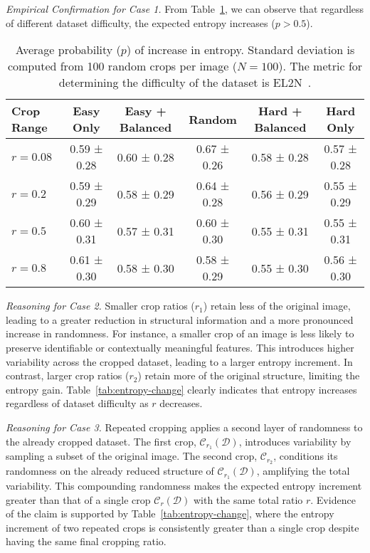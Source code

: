 \textit{Empirical Confirmation for Case 1.}
From Table~\ref{tab:entropy-increase}, we can observe that regardless of different dataset difficulty, the expected entropy increases ($p > 0.5$).

\begin{table}[H]
\centering
\caption{Average probability ($p$) of increase in entropy. Standard deviation is computed from 100 random crops per image ($N=100$).
The metric for determining the difficulty of the dataset is EL2N~\cite{paul2021deep}.
}
\label{tab:entropy-increase}
\begin{tabular}{@{}lccccc@{}}
\toprule
\textbf{Crop Range} & \textbf{Easy Only} & \textbf{Easy + Balanced} & \textbf{Random} & \textbf{Hard + Balanced} & \textbf{Hard Only} \\ \midrule
$r=0.08$ & 0.59 ± 0.28 & 0.60 ± 0.28 & 0.67 ± 0.26 & 0.58 ± 0.28 & 0.57 ± 0.28 \\
$r=0.2$  & 0.59 ± 0.29 & 0.58 ± 0.29 & 0.64 ± 0.28 & 0.56 ± 0.29 & 0.55 ± 0.29 \\
$r=0.5$  & 0.60 ± 0.31 & 0.57 ± 0.31 & 0.60 ± 0.30 & 0.55 ± 0.31 & 0.55 ± 0.31 \\
$r=0.8$  & 0.61 ± 0.30 & 0.58 ± 0.30 & 0.58 ± 0.29 & 0.55 ± 0.30 & 0.56 ± 0.30 \\ \bottomrule
\end{tabular}
\end{table}

\textit{Reasoning for Case 2.}
Smaller crop ratios (\( r_1 \)) retain less of the original image, leading to a greater reduction in structural information and a more pronounced increase in randomness. For instance, a smaller crop of an image is less likely to preserve identifiable or contextually meaningful features. This introduces higher variability across the cropped dataset, leading to a larger entropy increment. In contrast, larger crop ratios (\( r_2 \)) retain more of the original structure, limiting the entropy gain.
Table~\ref{tab:entropy-change} clearly indicates that entropy increases regardless of dataset difficulty as \( r \) decreases.

\textit{Reasoning for Case 3.}
Repeated cropping applies a second layer of randomness to the already cropped dataset. The first crop, \( \mathcal{C}_{r_1}(\mathcal{D}) \), introduces variability by sampling a subset of the original image. The second crop, \( \mathcal{C}_{r_2} \), conditions its randomness on the already reduced structure of \( \mathcal{C}_{r_1}(\mathcal{D}) \), amplifying the total variability. This compounding randomness makes the expected entropy increment greater than that of a single crop \( \mathcal{C}_r(\mathcal{D}) \) with the same total ratio \( r \). 
Evidence of the claim is supported by Table~\ref{tab:entropy-change}, where the entropy increment of two repeated crops is consistently greater than a single crop despite having the same final cropping ratio.



